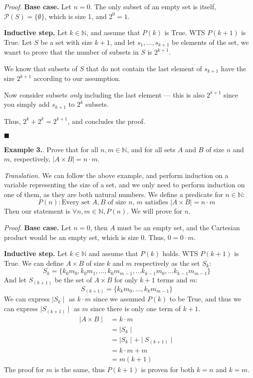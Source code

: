 \documentclass{article}
\newcounter{excount}
\newcommand\ex{\stepcounter{excount} \textbf{Example 3.\theexcount}. }
\newcommand\qedsymbol{\hfill$\blacksquare$}
\begin{document}
\textit{Proof.} \textbf{Base case.} Let $n = 0$. The only subset of an empty 
set is itself, $\mathcal{P} (S) = \{\emptyset\}$, which is size 1, and $2^0 
= 1$. 

\textbf{Inductive step.} Let $k \in \mathbb{N}$, and assume 
that $P(k)$ is True. WTS $P(k+1)$ is True. Let $S$ be a set with size $k+1$, 
and let $s_1, \ldots, s_{k+1}$ be elements of the set, we wanrt to prove that 
the number of subsets in $S$ is $2^{k+1}$. 

We know that subsets of $S$ that do not contain the last element of $s_{k+1}$ 
have the size $2^{k+1}$ according to our assumption. 

Now consider subsets \textit{only} including the last element --- this is also 
$2^{k+1}$ since you simply add $s_{k+1}$ to $2^k$ subsets. 

Thus, $2^k + 2^k = 2^{k+1}$, and concludes the proof. 

\qedsymbol

\ex Prove that for all $n, m \in \mathbb{N}$, and for all sets $A$ and $B$ 
of size $n$ and $m$, respectively, $\mid A \times B \mid = n \cdot m$.

\textit{Translation.} We can follow the above example, and perform induction 
on a variable representing the size of a set, and we only need to perform 
induction on one of them, as they are both natural numbers. We define a 
predicate for $n \in \mathbb{N}$:
$$P(n) : \text{Every set $A, B$ of size $n$, $m$ satisfies $\mid A \times 
B \mid = n \cdot m$}$$
Then our statement is $\forall n,m \in \mathbb{N}, P(n)$. We will prove for 
$n$.

\textit{Proof.} \textbf{Base case.} Let $ n = 0 $, then $A$ must be an 
empty set, and the Cartesian product would be an empty set, which is size 0.
Thus, $0 = 0 \cdot m$.

\textbf{Inductive step.} Let $k \in \mathbb{N}$ and assume that $P(k)$ holds. 
WTS $P(k+1)$ is True. We can define $A \times B$ of size $k$ and $m$ 
respectively as the set $S_k$:
$$S_k = \{ k_0m_0, 
k_0m_1, \ldots, k_0m_{m-1}, \ldots k_{k-1}m_0, \ldots k_{k-1} m_{m-1} \} $$
And let $S_{(k+1)}$ be the set of $ A \times B$ for only $k + 1$ terms and $m$: 
$$S_{(k+1)} = \{k_km_0 , \ldots, k_k m_{m-1} \}$$
We can express $\mid S_k \mid$ as $k \cdot m$ since we assumed $P(k)$ to be 
True, and thus we can express $\mid S_{(k+1)} \mid$ as $m$ since there is only 
one term of $k + 1$.
\begin{align*}
    \mid A \times B \mid &= k \cdot m \\
                         &= \mid S_k \mid \\
                         &= \mid S_k \mid + \mid S_{(k+1)} \mid \\
                         &= k \cdot m + m \\
                         &= m(k + 1) 
\end{align*}
The proof for $m$ is the same, thus $P(k+1)$ is proven for both $k = n$ and 
$k = m$. 
\end{document}
